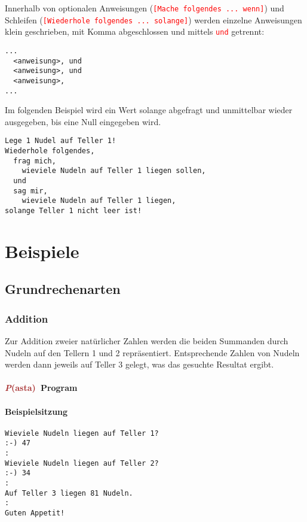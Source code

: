 \documentclass[11pt]{book}
\newcommand{\Pasta}{\textcolor{brown}{{\bf \em P}{\scriptsize{(asta)}}}}
\begin{document}
Innerhalb von optionalen Anweisungen (\textcolor{red}{\lstinline{[Mache folgendes ... wenn]}}) und Schleifen
(\textcolor{red}{\lstinline{[Wiederhole folgendes ... solange]}})
werden einzelne Anweisungen klein geschrieben, mit Komma abgeschlossen und mittels 
\textcolor{red}{\lstinline{und}} getrennt:
\color{red}
\begin{lstlisting}
...
  <anweisung>, und
  <anweisung>, und
  <anweisung>,
...
\end{lstlisting}
\color{black}
Im folgenden Beispiel wird ein Wert solange abgefragt und unmittelbar wieder
ausgegeben, bis eine Null eingegeben wird.
\color{blue}
\begin{lstlisting}
Lege 1 Nudel auf Teller 1!
Wiederhole folgendes,
  frag mich,
    wieviele Nudeln auf Teller 1 liegen sollen,
  und
  sag mir,
    wieviele Nudeln auf Teller 1 liegen,
solange Teller 1 nicht leer ist!
\end{lstlisting}
\color{black}

\chapter{Beispiele}

\section{Grundrechenarten}

\subsection{Addition}

Zur Addition zweier nat\"urlicher Zahlen werden die beiden Summanden
durch Nudeln auf den Tellern 1 und 2 repr\"asentiert. Entsprechende
Zahlen von Nudeln werden dann jeweils auf Teller 3 gelegt, was das 
gesuchte Resultat ergibt.

\subsubsection{\Pasta\ Program}
\color{blue}

\color{black}

\subsubsection{Beispielsitzung}
\color{purple}
\begin{lstlisting}
Wieviele Nudeln liegen auf Teller 1?
:-) 47
:
Wieviele Nudeln liegen auf Teller 2?
:-) 34
:
Auf Teller 3 liegen 81 Nudeln.
:
Guten Appetit!
\end{lstlisting}
\color{black}
\end{document}
